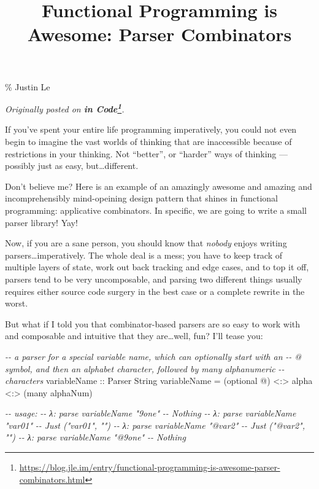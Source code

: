 \documentclass[]{article}
\title{Functional Programming is Awesome: Parser Combinators}
\newenvironment{Shaded}{}{}
\newcommand{\CharTok}[1]{\textcolor[rgb]{0.25,0.44,0.63}{#1}}
\newcommand{\CommentTok}[1]{\textcolor[rgb]{0.38,0.63,0.69}{\textit{#1}}}
\newcommand{\DataTypeTok}[1]{\textcolor[rgb]{0.56,0.13,0.00}{#1}}
\newcommand{\NormalTok}[1]{#1}
\newcommand{\OperatorTok}[1]{\textcolor[rgb]{0.40,0.40,0.40}{#1}}
\newcommand{\OtherTok}[1]{\textcolor[rgb]{0.00,0.44,0.13}{#1}}
\renewcommand{\href}[2]{#2\footnote{\url{#1}}}
\begin{document}
\maketitle

\% Justin Le

\emph{Originally posted on
\textbf{\href{https://blog.jle.im/entry/functional-programming-is-awesome-parser-combinators.html}{in
Code}}.}

If you've spent your entire life programming imperatively, you could not even
begin to imagine the vast worlds of thinking that are inaccessible because of
restrictions in your thinking. Not ``better'', or ``harder'' ways of thinking
--- possibly just as easy, but\ldots different.

Don't believe me? Here is an example of an amazingly awesome and amazing and
incomprehensibly mind-opeining design pattern that shines in functional
programming: applicative combinators. In specific, we are going to write a small
parser library! Yay!

Now, if you are a sane person, you should know that \emph{nobody} enjoys writing
parsers\ldots imperatively. The whole deal is a mess; you have to keep track of
multiple layers of state, work out back tracking and edge cases, and to top it
off, parsers tend to be very uncomposable, and parsing two different things
usually requires either source code surgery in the best case or a complete
rewrite in the worst.

But what if I told you that combinator-based parsers are so easy to work with
and composable and intuitive that they are\ldots well, fun? I'll tease you:

\begin{Shaded}
\begin{Highlighting}[]
\CommentTok{{-}{-} a parser for a special variable name, which can optionally start with an}
\CommentTok{{-}{-} \textasciigrave{}@\textasciigrave{} symbol, and then an alphabet character, followed by many alphanumeric}
\CommentTok{{-}{-} characters}
\OtherTok{variableName ::} \DataTypeTok{Parser} \DataTypeTok{String}
\NormalTok{variableName }\OtherTok{=}\NormalTok{ (optional }\CharTok{\textquotesingle{}@\textquotesingle{}}\NormalTok{) }\OperatorTok{\textless{}:\textgreater{}}\NormalTok{ alpha }\OperatorTok{\textless{}:\textgreater{}}\NormalTok{ (many alphaNum)}

\CommentTok{{-}{-} usage:}
\CommentTok{{-}{-} λ: parse variableName "9one"}
\CommentTok{{-}{-} Nothing}
\CommentTok{{-}{-} λ: parse variableName "var01"}
\CommentTok{{-}{-} Just ("var01", "")}
\CommentTok{{-}{-} λ: parse variableName "@var2"}
\CommentTok{{-}{-} Just ("@var2", "")}
\CommentTok{{-}{-} λ: parse variableName "@9one"}
\CommentTok{{-}{-} Nothing}
\end{Highlighting}
\end{Shaded}
\end{document}
